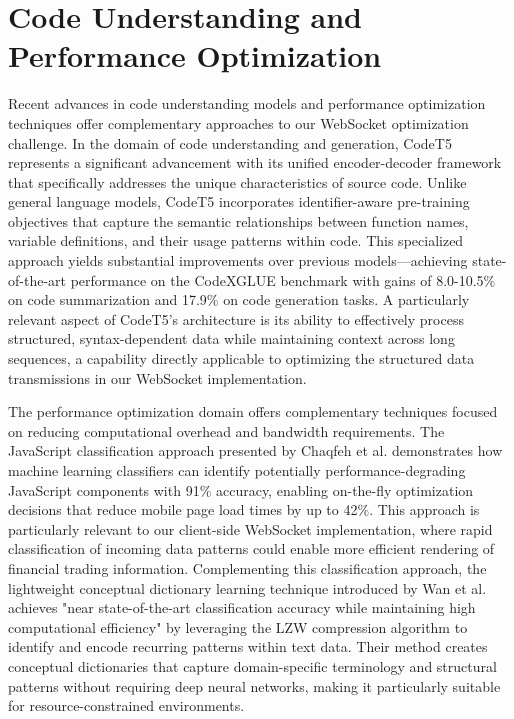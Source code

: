 \documentclass[a4paper, 11pt, twoside, openright]{report}
\begin{document}
\section{Code Understanding and Performance Optimization}
Recent advances in code understanding models and performance optimization techniques offer complementary approaches to our WebSocket optimization challenge. In the domain of code understanding and generation, CodeT5 \cite{CodeT5_2021} represents a significant advancement with its unified encoder-decoder framework that specifically addresses the unique characteristics of source code. Unlike general language models, CodeT5 incorporates identifier-aware pre-training objectives that capture the semantic relationships between function names, variable definitions, and their usage patterns within code. This specialized approach yields substantial improvements over previous models—achieving state-of-the-art performance on the CodeXGLUE benchmark \cite{CodeXGLUE2021} with gains of 8.0-10.5\% on code summarization and 17.9\% on code generation tasks. A particularly relevant aspect of CodeT5's architecture is its ability to effectively process structured, syntax-dependent data while maintaining context across long sequences, a capability directly applicable to optimizing the structured data transmissions in our WebSocket implementation.

The performance optimization domain offers complementary techniques focused on reducing computational overhead and bandwidth requirements. The JavaScript classification approach presented by Chaqfeh et al. \cite{JSAccel2023} demonstrates how machine learning classifiers can identify potentially performance-degrading JavaScript components with 91\% accuracy, enabling on-the-fly optimization decisions that reduce mobile page load times by up to 42\%. This approach is particularly relevant to our client-side WebSocket implementation, where rapid classification of incoming data patterns could enable more efficient rendering of financial trading information. Complementing this classification approach, the lightweight conceptual dictionary learning technique introduced by Wan et al. \cite{LZWDict2024} achieves "near state-of-the-art classification accuracy while maintaining high computational efficiency" by leveraging the LZW compression algorithm to identify and encode recurring patterns within text data. Their method creates conceptual dictionaries that capture domain-specific terminology and structural patterns without requiring deep neural networks, making it particularly suitable for resource-constrained environments.
\end{document}

